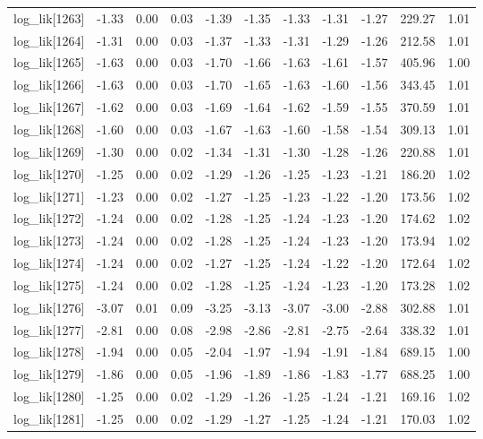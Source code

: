 \begin{table}[ht]
\begin{tabular}{rrrrrrrrrrr}
  log\_lik[1263] & -1.33 & 0.00 & 0.03 & -1.39 & -1.35 & -1.33 & -1.31 & -1.27 & 229.27 & 1.01 \\ 
  log\_lik[1264] & -1.31 & 0.00 & 0.03 & -1.37 & -1.33 & -1.31 & -1.29 & -1.26 & 212.58 & 1.01 \\ 
  log\_lik[1265] & -1.63 & 0.00 & 0.03 & -1.70 & -1.66 & -1.63 & -1.61 & -1.57 & 405.96 & 1.00 \\ 
  log\_lik[1266] & -1.63 & 0.00 & 0.03 & -1.70 & -1.65 & -1.63 & -1.60 & -1.56 & 343.45 & 1.01 \\ 
  log\_lik[1267] & -1.62 & 0.00 & 0.03 & -1.69 & -1.64 & -1.62 & -1.59 & -1.55 & 370.59 & 1.01 \\ 
  log\_lik[1268] & -1.60 & 0.00 & 0.03 & -1.67 & -1.63 & -1.60 & -1.58 & -1.54 & 309.13 & 1.01 \\ 
  log\_lik[1269] & -1.30 & 0.00 & 0.02 & -1.34 & -1.31 & -1.30 & -1.28 & -1.26 & 220.88 & 1.01 \\ 
  log\_lik[1270] & -1.25 & 0.00 & 0.02 & -1.29 & -1.26 & -1.25 & -1.23 & -1.21 & 186.20 & 1.02 \\ 
  log\_lik[1271] & -1.23 & 0.00 & 0.02 & -1.27 & -1.25 & -1.23 & -1.22 & -1.20 & 173.56 & 1.02 \\ 
  log\_lik[1272] & -1.24 & 0.00 & 0.02 & -1.28 & -1.25 & -1.24 & -1.23 & -1.20 & 174.62 & 1.02 \\ 
  log\_lik[1273] & -1.24 & 0.00 & 0.02 & -1.28 & -1.25 & -1.24 & -1.23 & -1.20 & 173.94 & 1.02 \\ 
  log\_lik[1274] & -1.24 & 0.00 & 0.02 & -1.27 & -1.25 & -1.24 & -1.22 & -1.20 & 172.64 & 1.02 \\ 
  log\_lik[1275] & -1.24 & 0.00 & 0.02 & -1.28 & -1.25 & -1.24 & -1.23 & -1.20 & 173.28 & 1.02 \\ 
  log\_lik[1276] & -3.07 & 0.01 & 0.09 & -3.25 & -3.13 & -3.07 & -3.00 & -2.88 & 302.88 & 1.01 \\ 
  log\_lik[1277] & -2.81 & 0.00 & 0.08 & -2.98 & -2.86 & -2.81 & -2.75 & -2.64 & 338.32 & 1.01 \\ 
  log\_lik[1278] & -1.94 & 0.00 & 0.05 & -2.04 & -1.97 & -1.94 & -1.91 & -1.84 & 689.15 & 1.00 \\ 
  log\_lik[1279] & -1.86 & 0.00 & 0.05 & -1.96 & -1.89 & -1.86 & -1.83 & -1.77 & 688.25 & 1.00 \\ 
  log\_lik[1280] & -1.25 & 0.00 & 0.02 & -1.29 & -1.26 & -1.25 & -1.24 & -1.21 & 169.16 & 1.02 \\ 
  log\_lik[1281] & -1.25 & 0.00 & 0.02 & -1.29 & -1.27 & -1.25 & -1.24 & -1.21 & 170.03 & 1.02 \\ 

\end{tabular}
\end{table}
